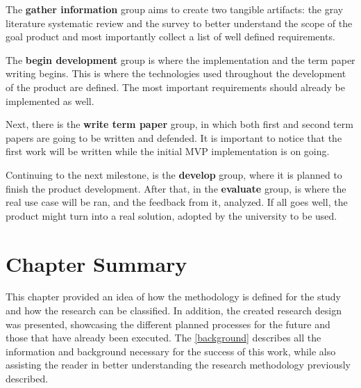 The \textbf{gather information} group aims to create two tangible artifacts: the gray literature systematic review and the survey to better understand the scope of the goal product and most importantly collect a list of well defined requirements.

The \textbf{begin development} group is where the implementation and the term paper writing begins. This is where the technologies used throughout the development of the product are defined. The most important requirements should already be implemented as well.

Next, there is the \textbf{write term paper} group, in which both first and second term papers are going to be written and defended. It is important to notice that the first work will be written while the initial \ac{MVP} implementation is on going.

Continuing to the next milestone, is the \textbf{develop} group, where it is planned to finish the product development. After that, in the \textbf{evaluate} group, is where the real use case will be ran, and the feedback from it, analyzed. If all goes well, the product might turn into a real solution, adopted by the university to be used.


\section{Chapter Summary}\label{sec:met-4}

This chapter provided an idea of how the methodology is defined for the study and how the research can be classified. In addition, the created research design was presented, showcasing the different planned processes for the future and those that have already been executed. The \autoref{background} describes all the information and background necessary for the success of this work, while also assisting the reader in better understanding the research methodology previously described.



